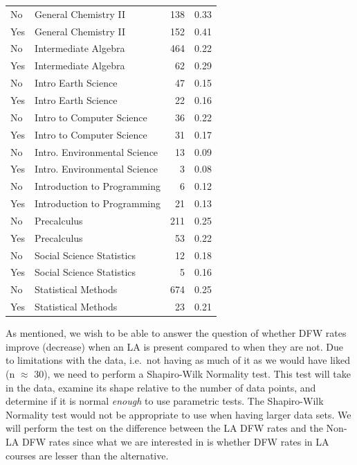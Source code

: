 \documentclass[]{article}
\begin{document}
\begin{longtable}{llrr}
\rowcolor{gray!6}  No & General Chemistry II & 138 & 0.33\\
Yes & General Chemistry II & 152 & 0.41\\
\addlinespace
\rowcolor{gray!6}  No & Intermediate Algebra & 464 & 0.22\\
Yes & Intermediate Algebra & 62 & 0.29\\
\rowcolor{gray!6}  No & Intro Earth Science & 47 & 0.15\\
Yes & Intro Earth Science & 22 & 0.16\\
\rowcolor{gray!6}  No & Intro to Computer Science & 36 & 0.22\\
\addlinespace
Yes & Intro to Computer Science & 31 & 0.17\\
\rowcolor{gray!6}  No & Intro. Environmental Science & 13 & 0.09\\
Yes & Intro. Environmental Science & 3 & 0.08\\
\rowcolor{gray!6}  No & Introduction to Programming & 6 & 0.12\\
Yes & Introduction to Programming & 21 & 0.13\\
\addlinespace
\rowcolor{gray!6}  No & Precalculus & 211 & 0.25\\
Yes & Precalculus & 53 & 0.22\\
\rowcolor{gray!6}  No & Social Science Statistics & 12 & 0.18\\
Yes & Social Science Statistics & 5 & 0.16\\
\rowcolor{gray!6}  No & Statistical Methods & 674 & 0.25\\
\addlinespace
Yes & Statistical Methods & 23 & 0.21\\*
\end{longtable}
\endgroup{}

As mentioned, we wish to be able to answer the question of whether DFW
rates improve (decrease) when an LA is present compared to when they are
not. Due to limitations with the data, i.e.~not having as much of it as
we would have liked (n \(\approx\) 30), we need to perform a
Shapiro-Wilk Normality test. This test will take in the data, examine
its shape relative to the number of data points, and determine if it is
normal \emph{enough} to use parametric tests. The Shapiro-Wilk Normality
test would not be appropriate to use when having larger data sets. We
will perform the test on the difference between the LA DFW rates and the
Non-LA DFW rates since what we are interested in is whether DFW rates in
LA courses are lesser than the alternative.
\end{document}
